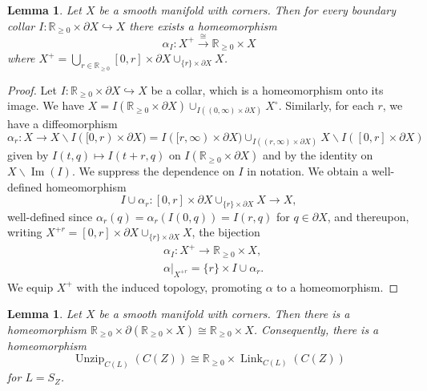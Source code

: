 \documentclass[11pt]{amsart}
\newcommand{\mbb}[1]{\mathbb{#1}}
\newcommand{\R}{\mbb{R}}
\DeclareMathOperator{\Imm}{Im}
\DeclareMathOperator{\Unzip}{Unzip}
\DeclareMathOperator{\Link}{Link}
\numberwithin{equation}{section}
\theoremstyle{definition}
\theoremstyle{remark}
\theoremstyle{plain}
\newtheorem{lemma}[equation]{Lemma}
\begin{document}
\begin{lemma}\label{K52SWOM}
    Let $X$ be a smooth manifold with corners. Then for every boundary collar $I\colon \R_{\geq0}\times \partial X\hookrightarrow X$ there exists a homeomorphism
    \[
        \alpha_I\colon X^+\xrightarrow{\cong}\R_{\geq0}\times X
    \]
    where $X^+=\bigcup_{r\in\R_{\geq0}}[0,r]\times\partial X\cup_{\{r\}\times\partial X}X$.
\end{lemma}
\begin{proof}
    Let $I\colon\R_{\geq0}\times\partial X\hookrightarrow X$ be a collar, which is a homeomorphism onto its image. We have $X=I(\R_{\geq0}\times \partial X)\cup_{I((0,\infty)\times\partial X)}X^\circ$. Similarly, for each $r$, we have a diffeomorphism 
    \[
        \alpha_r\colon X\to X\smallsetminus I([0,r)\times\partial X)=I([r,\infty)\times\partial X)\cup_{I((r,\infty)\times\partial X)}X\smallsetminus I([0,r]\times\partial X)
    \]
    given by $I(t,q)\mapsto I(t+r,q)$ on $I(\R_{\geq0}\times\partial X)$ and by the identity on $X\smallsetminus \Imm(I)$. We suppress the dependence on $I$ in notation. We obtain a well-defined homeomorphism 
    \[
        I\cup\alpha_r\colon [0,r]\times\partial X\cup_{\{r\}\times \partial X}X\to X,
    \]
    well-defined since $\alpha_r(q)=\alpha_r(I(0,q))=I(r,q)$ for $q\in\partial X$, and thereupon, writing $X^{+r}=[0,r]\times\partial X\cup_{\{r\}\times \partial X}X$, the bijection 
    \begin{align*}
        &\alpha_I\colon X^+\to \R_{\geq0}\times X,\\
        &\alpha|_{X^{+r}}=\{r\}\times I\cup\alpha_r.
    \end{align*}
    We equip $X^+$ with the induced topology, promoting $\alpha$ to a homeomorphism.
\end{proof}


\begin{lemma}\label{DGSR46V}
    Let $X$ be a smooth manifold with corners. Then there is a homeomorphism $\R_{\geq0}\times \partial(\R_{\geq0}\times X)\cong\R_{\geq0} \times X$. Consequently, there is a homeomorphism
    \[
        \Unzip_{C(L)}(C(Z))\cong\R_{\geq0}\times\Link_{C(L)}(C(Z))
    \] 
    for $L=S_Z$.
\end{lemma}
\end{document}
